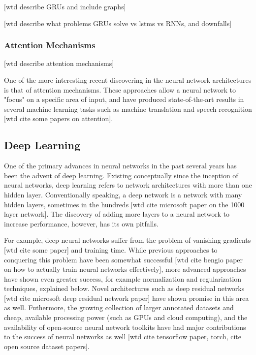 [wtd describe GRUs and include graphs]

[wtd describe what problems GRUs solve vs lstms vs RNNs, and downfalls]

\subsubsection{Attention Mechanisms}

[wtd describe attention mechanisms]

One of the more interesting recent discovering in the neural network architectures is that of attention mechanisms.  These approaches allow a neural network to "focus" on a specific area of input, and have produced state-of-the-art results in several machine learning tasks such as machine translation and speech recognition [wtd cite some papers on attention].

\subsection{Deep Learning}

One of the primary advances in neural networks in the past several years has been the advent of deep learning.  Existing conceptually since the inception of neural networks, deep learning refers to network architectures with more than one hidden layer.  Conventionally speaking, a deep network is a network with many hidden layers, sometimes in the hundreds [wtd cite microsoft paper on the 1000 layer network].  The discovery of adding more layers to a neural network to increase performance, however, has its own pitfalls.

For example, deep neural networks suffer from the problem of vanishing gradients [wtd cite some paper] and training time.  While previous approaches to conquering this problem have been somewhat successful [wtd cite bengio paper on how to actually train neural networks effectively], more advanced approaches have shown even greater success, for example normalization and regularization techniques, explained below.  Novel architectures such as deep residual networks [wtd cite microsoft deep residual network paper] have shown promise in this area as well.  Futhermore, the growing collection of larger annotated datasets and cheap, available processing power (such as GPUs and cloud computing), and the availability of open-source neural network toolkits have had major contributions to the success of neural networks as well [wtd cite tensorflow paper, torch, cite open source dataset papers].


